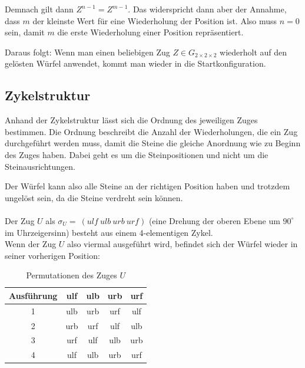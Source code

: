 \documentclass[12pt,a4paper, usenames, dvipsnames]{article}
\newcommand{\Gtwo}{\ensuremath{G_{2\times 2\times 2}}}
\begin{document}
Demnach gilt dann $Z^{n-1}=Z^{m-1}$. Das widerspricht dann aber der Annahme, dass $m$ der kleinste Wert für eine Wiederholung der Position ist. Also muss $n=0$ sein, damit $m$ die erste Wiederholung einer Position repräsentiert. 


Daraus folgt: Wenn man einen beliebigen Zug $Z \in \Gtwo$ wiederholt auf den gelösten Würfel anwendet, kommt man wieder in die Startkonfiguration.
 
%
%
%
%
%
%
%
%
%
%
%
%
%
%
%
%
%
%
%
%


\subsection*{Zykelstruktur}


Anhand der Zykelstruktur lässt sich die Ordnung des jeweiligen Zuges bestimmen. Die Ordnung beschreibt die Anzahl der Wiederholungen, die ein Zug durchgeführt werden muss, damit die Steine die gleiche Anordnung wie zu Beginn des Zuges haben. Dabei geht es um die Steinpositionen und nicht um die Steinausrichtungen.

Der Würfel kann also alle Steine an der richtigen Position haben und trotzdem ungelöst sein, da die Steine verdreht sein können. \\
\\
Der Zug $U$ als $\sigma_U =\ (ulf \ ulb \ urb \ urf) $ (eine Drehung der oberen Ebene um $90^\circ$ im Uhrzeigersinn) besteht aus einem 4-elementigen Zykel. \\
Wenn der Zug $U$ also viermal ausgeführt wird, befindet sich der Würfel wieder in seiner vorherigen Position: 

\begin{table}[H]
\centering
\begin{tabular}{|c||c|c|c|c|}
\hline
Ausführung & ulf & ulb & urb & urf \\
\hline
\hline
1 & ulb & urb & urf & ulf \\
\hline
2 & urb & urf & ulf & ulb \\
\hline
3 & urf & ulf & ulb & urb \\
\hline
4 & ulf & ulb & urb & urf \\
\hline

\end{tabular}
\caption[Permutationen des Zuges $U$]{Permutationen des Zuges $U$}
\end{table}
\end{document}
